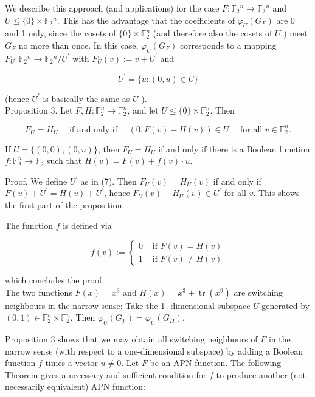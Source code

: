 \documentclass[10pt]{article}
\begin{document}
We describe this approach (and applications) for the case $F: \mathbb{F}_{2}{ }^{n} \rightarrow \mathbb{F}_{2}{ }^{n}$ and $U \leq\{0\} \times \mathbb{F}_{2}{ }^{n}$. This has the advantage that the coefficients of $\varphi_{U}\left(G_{F}\right)$ are 0 and 1 only, since the cosets of $\{0\} \times \mathbb{F}_{2}^{n}$ (and therefore also the cosets of $U$ ) meet $G_{F}$ no more than once. In this case, $\varphi_{U}\left(G_{F}\right)$ corresponds to a mapping $F_{U}: \mathbb{F}_{2}{ }^{n} \rightarrow \mathbb{F}_{2}{ }^{n} / U^{\prime}$ with $F_{U}(v):=v+U^{\prime}$ and


\begin{equation*}
U^{\prime}=\{u:(0, u) \in U\} \tag{7}
\end{equation*}


(hence $U^{\prime}$ is basically the same as $U$ ).\\
Proposition 3. Let $F, H: \mathbb{F}_{2}^{n} \rightarrow \mathbb{F}_{2}^{n}$, and let $U \leq\{0\} \times \mathbb{F}_{2}^{n}$. Then

$$
F_{U}=H_{U} \quad \text { if and only if } \quad(0, F(v)-H(v)) \in U \quad \text { for all } v \in \mathbb{F}_{2}^{n} .
$$

If $U=\{(0,0),(0, u)\}$, then $F_{U}=H_{U}$ if and only if there is a Boolean function $f: \mathbb{F}_{2}^{n} \rightarrow \mathbb{F}_{2}$ such that $H(v)=F(v)+f(v) \cdot u$.

Proof. We define $U^{\prime}$ as in (7). Then $F_{U}(v)=H_{U}(v)$ if and only if $F(v)+U^{\prime}=H(v)+U^{\prime}$, hence $F_{U}(v)-H_{U}(v) \in U^{\prime}$ for all $v$. This shows the first part of the proposition.

The function $f$ is defined via

$$
f(v):= \begin{cases}0 & \text { if } F(v)=H(v) \\ 1 & \text { if } F(v) \neq H(v)\end{cases}
$$

which concludes the proof.\\
The two functions $F(x)=x^{3}$ and $H(x)=x^{3}+\operatorname{tr}\left(x^{9}\right)$ are switching neighbours in the narrow sense: Take the 1 -dimensional subspace $U$ generated by $(0,1) \in \mathbb{F}_{2}^{n} \times \mathbb{F}_{2}^{n}$. Then $\varphi_{U}\left(G_{F}\right)= \varphi_{U}\left(G_{H}\right)$.

Proposition 3 shows that we may obtain all switching neighbours of $F$ in the narrow sense (with respect to a one-dimensional subspace) by adding a Boolean function $f$ times a vector $u \neq 0$. Let $F$ be an APN function. The following Theorem gives a necessary and sufficient condition for $f$ to produce another (not necessarily equivalent) APN function:
\end{document}
